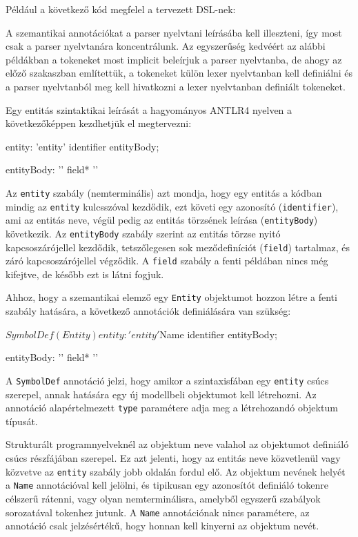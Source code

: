 \documentclass[12pt, a4paper]{report}
\newcommand{\f}[1]{\texttt{#1}}
\begin{document}
Például a következő kód megfelel a tervezett DSL-nek:


A szemantikai annotációkat a parser nyelvtani leírásába kell illeszteni, így most csak a parser nyelvtanára koncentrálunk. Az egyszerűség kedvéért az alábbi példákban a tokeneket most implicit beleírjuk a parser nyelvtanba, de ahogy az előző szakaszban említettük, a tokeneket külön lexer nyelvtanban kell definiálni és a parser nyelvtanból meg kell hivatkozni a lexer nyelvtanban definiált tokeneket.

Egy entitás szintaktikai leírását a hagyományos ANTLR4 nyelven a következőképpen kezdhetjük el megtervezni:

\begin{antlr4code}
entity: 'entity' identifier entityBody;

entityBody: '{' field* '}'
\end{antlr4code}

Az \f{entity} szabály (nemterminális) azt mondja, hogy egy entitás a kódban mindig az \f{entity} kulcsszóval kezdődik, ezt követi egy azonosító (\f{identifier}), ami az entitás neve, végül pedig az entitás törzsének leírása (\f{entityBody}) következik. Az \f{entityBody} szabály szerint az entitás törzse nyitó kapcsoszárójellel kezdődik, tetszőlegesen sok meződefiníciót (\f{field}) tartalmaz, és záró kapcsoszárójellel végződik. A \f{field} szabály a fenti példában nincs még kifejtve, de később ezt is látni fogjuk.

Ahhoz, hogy a szemantikai elemző egy \f{Entity} objektumot hozzon létre a fenti szabály hatására, a következő annotációk definiálására van szükség:

\begin{antlr4code}
$SymbolDef(Entity)
entity: 'entity' $Name identifier entityBody;

entityBody: '{' field* '}'
\end{antlr4code}

A \f{SymbolDef} annotáció jelzi, hogy amikor a szintaxisfában egy \f{entity} csúcs szerepel, annak hatására egy új modellbeli objektumot kell létrehozni. Az annotáció alapértelmezett \f{type} paramétere adja meg a létrehozandó objektum típusát.

Strukturált programnyelveknél az objektum neve valahol az objektumot definiáló csúcs részfájában szerepel. Ez azt jelenti, hogy az entitás neve közvetlenül vagy közvetve az \f{entity} szabály jobb oldalán fordul elő. Az objektum nevének helyét a \f{Name} annotációval kell jelölni, és tipikusan egy azonosítót definiáló tokenre célszerű rátenni, vagy olyan nemterminálisra, amelyből egyszerű szabályok sorozatával tokenhez jutunk. A \f{Name} annotációnak nincs paramétere, az annotáció csak jelzésértékű, hogy honnan kell kinyerni az objektum nevét.
\end{document}
